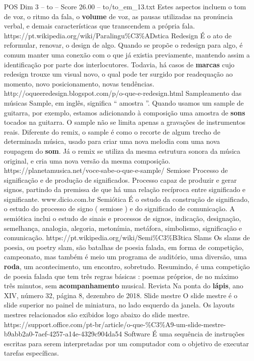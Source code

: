 \begin{textsample}{POS Dim 3 – to – Score 26.00 – to/to\_em\_13.txt}
Estes aspectos incluem o tom de voz, o ritmo da fala, o \textbf{volume} de voz, as pausas utilizadas na pronúncia verbal, e demais características que transcendem a própria fala. https://pt.wikipedia.org/wiki/Paralingu\%C3\%ADstica Redesign É o ato de reformular, renovar, o design de algo.
Quando se propõe o redesign para algo, é comum manter uma conexão com o que já existia previamente, mantendo assim a identificação por parte dos interlocutores.
Todavia, há casos de \textbf{marcas} cujo redesign trouxe um visual novo, o qual pode ter surgido por readequação ao momento, novo posicionamento, novas tendências. http://oqueeredesign.blogspot.com/p/o-que-e-redesign.html Sampleamento das músicas Sample, em inglês, significa “ amostra ”.
Quando usamos um sample de guitarra, por exemplo, estamos adicionando à composição uma amostra de \textbf{sons} tocados na guitarra.
O sample não se limita apenas a gravações de instrumentos reais.
Diferente do remix, o sample é como o recorte de algum trecho de determinada música, usado para criar uma nova melodia com uma nova roupagem do \textbf{som}.
Já o remix se utiliza da mesma estrutura sonora da música original, e cria uma nova versão da mesma composição. https://planetamusica.net/voce-sabe-o-que-e-sample/ Semiose Processo de significação e de produção de significados.
Processo capaz de produzir e gerar signos, partindo da premissa de que há uma relação recíproca entre significado e significante. www.dicio.com.br Semiótica É o estudo da construção de significado, o estudo do processo de signo ( semiose ) e do significado de comunicação.
A semiótica inclui o estudo de sinais e processos de signos, indicação, designação, semelhança, analogia, alegoria, metonímia, metáfora, simbolismo, significação e comunicação. https://pt.wikipedia.org/wiki/Semi\%C3\%B3tica Slams Os slams de poesia, ou poetry slam, são batalhas de poesia falada, em forma de competição, campeonato, mas também é meio um programa de auditório, uma diversão, uma \textbf{roda}, um acontecimento, um encontro, sobretudo.
Resumindo, é uma competição de poesia falada que tem três regras básicas : poemas próprios, de no máximo três minutos, sem \textbf{acompanhamento} musical.
Revista Na ponta do \textbf{lápis}, ano XIV, número 32, página 8, dezembro de 2018.
Slide mestre O slide mestre é o slide superior no painel de miniatura, no lado esquerdo da janela.
Os layouts mestres relacionados são exibidos logo abaixo do slide mestre. https://support.office.com/pt-br/article/o-que-\%C3\%A9-um-slide-mestre-b9abb2a0-7aef-4257-a14e-4329c904da54 Software É uma sequência de instruções escritas para serem interpretadas por um computador com o objetivo de executar tarefas específicas.

\end{textsample}
